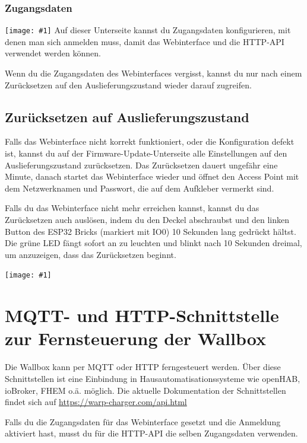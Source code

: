 \documentclass[a4paper,10pt]{article}
\newcommand{\hint}[1]{\begin{tcolorbox}[colback=boxgray,colframe=black,coltext=
white,title=Hinweis]#1\end{tcolorbox}}
\newcommand{\gfx}[1]{\texttt{[image: \#1]}}
\begin{document}
\begin{multicols*}{2}
	\subsubsection{Zugangsdaten}
	\gfx{./img_warp2/resized/web_authentication}
	Auf dieser Unterseite kannst du Zugangsdaten konfigurieren, mit denen man sich anmelden muss,
	damit das Webinterface und die HTTP-API verwendet werden können.
	\hint{Wenn du die Zugangsdaten des Webinterfaces vergisst, kannst du nur nach einem Zurücksetzen
	auf den Auslieferungszustand wieder darauf zugreifen.}

	\subsection{Zurücksetzen auf Auslieferungszustand}\label{reset}
	Falls das Webinterface nicht korrekt funktioniert, oder die Konfiguration defekt ist,
	kannst du auf der Firmware-Update-Unterseite alle Einstellungen auf den Auslieferungszustand zurücksetzen.
	Das Zurücksetzen dauert ungefähr eine Minute, danach startet das Webinterface wieder und öffnet
	den Access Point mit dem Netzwerknamen und Passwort, die auf dem Aufkleber vermerkt sind.

	Falls du das Webinterface nicht mehr erreichen kannst, kannst du das Zurücksetzen auch
	auslösen, indem du den Deckel abschraubst und den linken Button des ESP32 Bricks (markiert mit IO0)
	10 Sekunden lang gedrückt hältst. Die grüne LED fängt sofort an zu leuchten und blinkt nach 10 Sekunden
	dreimal, um anzuzeigen, dass das Zurücksetzen beginnt.

	\vfill

	\gfx{./img_warp2/resized/warp_esp_open}
	\newpage
	\section{MQTT- und HTTP-Schnittstelle zur Fernsteuerung der Wallbox}
	Die Wallbox kann per MQTT oder HTTP ferngesteuert werden. Über diese Schnittstellen ist eine
	Einbindung in Hausautomatisationssysteme wie openHAB, ioBroker, FHEM o.ä. möglich. Die aktuelle
	Dokumentation der Schnittstellen findet sich auf \url{https://warp-charger.com/api.html}

	Falls du die Zugangsdaten für das Webinterface gesetzt und die Anmeldung aktiviert hast, musst du
	für die HTTP-API die selben Zugangsdaten verwenden.


\end{multicols*}
\end{document}
